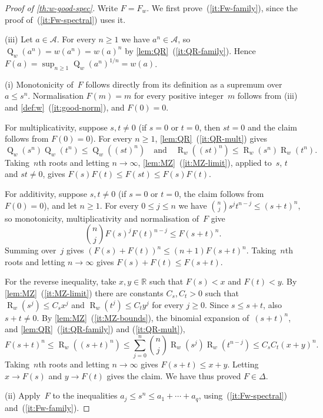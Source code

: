 \documentclass[11pt,letterpaper]{article}
\DeclareMathOperator{\subrank}{Q}
\DeclareMathOperator{\tensorrank}{R}
\newcommand{\RR}{\mathbb{R}}
\begin{document}
\begin{proof}[Proof of \cref{th:w-good-spec}]
Write $F = F_w$. We first prove~(\ref{it:Fw-family}), since the proof of~(\ref{it:Fw-spectral}) uses it.

(iii) Let $a \in \mathcal{A}$. For every $n \geq 1$ we have $a^n \in \mathcal{A}$, so $\subrank_w(a^n) = w(a^n) = w(a)^n$ by \cref{lem:QR}~(\ref{it:QR-family}). Hence $F(a) = \sup_{n \geq 1} \subrank_w(a^n)^{1/n} = w(a)$.

(i)
Monotonicity of~$F$ follows directly from its definition as a supremum over $a \leq s^n$. Normalisation $F(m) = m$ for every positive integer~$m$ follows from (iii) and \cref{def:w}~(\ref{it:good-norm}), and $F(0) = 0$.

For multiplicativity, suppose $s,t \neq 0$ (if $s = 0$ or $t = 0$, then $st = 0$ and the claim follows from $F(0) = 0$). For every $n \geq 1$, \cref{lem:QR}~(\ref{it:QR-mult}) gives
\[
\subrank_w(s^n) \subrank_w(t^n) \leq \subrank_w((st)^n)
\quad\text{and}\quad
\tensorrank_w((st)^n) \leq \tensorrank_w(s^n) \tensorrank_w(t^n).
\]
Taking~$n$th roots and letting $n \to \infty$, \cref{lem:MZ}~(\ref{it:MZ-limit}), applied to~$s$, $t$ and $st \neq 0$, gives $F(s)F(t) \leq F(st) \leq F(s)F(t)$.

For additivity, suppose $s,t \neq 0$ (if $s = 0$ or $t = 0$, the claim follows from $F(0) = 0$), and let $n \geq 1$. For every $0 \leq j \leq n$ we have $\binom{n}{j} s^j t^{n-j} \leq (s+t)^n$, so monotonicity, multiplicativity and normalisation of~$F$ give
\[
\binom{n}{j} F(s)^j F(t)^{n-j} \leq F(s+t)^n.
\]
Summing over~$j$ gives $(F(s) + F(t))^n \leq (n+1) F(s+t)^n$. Taking~$n$th roots and letting $n \to \infty$ gives $F(s) + F(t) \leq F(s+t)$.

For the reverse inequality, take $x,y \in \RR$ such that $F(s) < x$ and $F(t) < y$. By \cref{lem:MZ}~(\ref{it:MZ-limit}) there are constants $C_s, C_t > 0$ such that $\tensorrank_w(s^j) \leq C_s x^j$ and $\tensorrank_w(t^j) \leq C_t y^j$ for every $j \geq 0$. Since $s \leq s + t$, also $s + t \neq 0$. By \cref{lem:MZ}~(\ref{it:MZ-bounds}), the binomial expansion of~$(s+t)^n$, and \cref{lem:QR}~(\ref{it:QR-family}) and (\ref{it:QR-mult}),
\[
F(s+t)^n \leq \tensorrank_w((s+t)^n) \leq \sum_{j=0}^n \binom{n}{j} \tensorrank_w(s^j) \tensorrank_w(t^{n-j}) \leq C_s C_t (x+y)^n.
\]
Taking~$n$th roots and letting $n \to \infty$ gives $F(s+t) \leq x + y$. Letting $x \to F(s)$ and $y \to F(t)$ gives the claim.
We have thus proved $F \in \Delta$.

(ii) Apply~$F$ to the inequalities $a_j \leq s^n \leq a_1 + \cdots + a_q$, using~(\ref{it:Fw-spectral}) and~(\ref{it:Fw-family}).


\end{proof}
\end{document}
